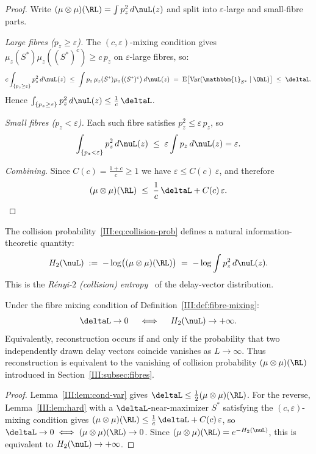 \begin{proof}
Write $(\mu\otimes\mu)(\RL) = \int p_z^2\,d\nuL(z)$ and split into
$\varepsilon$-large and small-fibre parts.

\emph{Large fibres ($p_z \geq \varepsilon$).}
The $(c,\varepsilon)$-mixing condition gives
$\mu_z(S^*)\mu_z((S^*)^c) \geq c\,p_z$ on $\varepsilon$-large fibres, so:
\[
  c\int_{\{p_z \geq \varepsilon\}} p_z^2\,d\nuL(z)
  \;\leq\; \int p_z\,\mu_z(S^*)\mu_z\bigl((S^*)^c\bigr)\,d\nuL(z)
  \;=\; \mathrm{E}\bigl[\mathrm{Var}(\mathbbm{1}_{S^*}\mid\OhL)\bigr]
  \;\leq\; \deltaL.
\]
Hence $\int_{\{p_z \geq \varepsilon\}} p_z^2\,d\nuL(z) \leq \frac{1}{c}\,\deltaL$.

\emph{Small fibres ($p_z < \varepsilon$).}
Each such fibre satisfies $p_z^2 \leq \varepsilon\,p_z$, so
\[
  \int_{\{p_z < \varepsilon\}} p_z^2\,d\nuL(z)
  \;\leq\; \varepsilon\int p_z\,d\nuL(z) = \varepsilon.
\]

\emph{Combining.}
Since $C(c) = \frac{1+c}{c} \geq 1$ we have $\varepsilon \leq C(c)\,\varepsilon$,
and therefore
\[
  (\mu\otimes\mu)(\RL) \;\leq\; \frac{1}{c}\,\deltaL + C(c)\,\varepsilon. \qedhere
\]
\end{proof}

The collision probability~\eqref{III:eq:collision-prob} defines a natural
information-theoretic quantity:
\begin{equation}
  H_2(\nuL) \;:=\; -\log\bigl((\mu \otimes \mu)(\RL)\bigr)
  \;=\; -\log \int p_z^2\,d\nuL(z).
  \label{III:eq:entropy}
\end{equation}
This is the \emph{Rényi-$2$ (collision) entropy}~\cite{Renyi1961} of the delay-vector distribution.

\begin{corollary}
\label{III:cor:entropy}
Under the fibre mixing condition of Definition~\ref{III:def:fibre-mixing}:
\[
  \deltaL \to 0
  \quad\iff\quad
  H_2(\nuL) \to +\infty.
\]
Equivalently, reconstruction occurs if and only if the probability that two
independently drawn delay vectors coincide vanishes as $L \to \infty$.
Thus reconstruction is equivalent to the vanishing of collision probability
$(\mu \otimes \mu)(\RL)$ introduced in Section~\ref{III:subsec:fibres}.
\end{corollary}

\begin{proof}
Lemma~\ref{III:lem:cond-var} gives $\deltaL \leq \tfrac{1}{2}(\mu\otimes\mu)(\RL)$.
For the reverse, Lemma~\ref{III:lem:hard} with a $\deltaL$-near-maximizer $S^*$
satisfying the $(c,\varepsilon)$-mixing condition gives
$(\mu\otimes\mu)(\RL) \leq \frac{1}{c}\,\deltaL + C(c)\,\varepsilon$,
so $\deltaL \to 0 \iff (\mu\otimes\mu)(\RL) \to 0$.
Since $(\mu\otimes\mu)(\RL) = e^{-H_2(\nuL)}$, this is equivalent to
$H_2(\nuL) \to +\infty$.
\end{proof}

